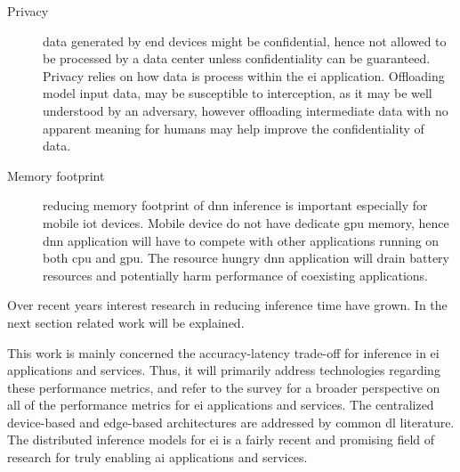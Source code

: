 \begin{description}
	\item[Privacy] data generated by end devices might be confidential, hence not allowed to be processed by a data center unless confidentiality can be guaranteed. Privacy relies on how data is process within the \gls{ei} application. Offloading model input data, may be susceptible to interception, as it may be well understood by an adversary, however offloading intermediate data with no apparent meaning for humans may help improve the confidentiality of data.    
	
	\item[Memory footprint] reducing memory footprint of \gls{dnn} inference is important especially for mobile \gls{iot} devices. Mobile device do not have dedicate \gls{gpu} memory, hence \gls{dnn} application will have to compete with other applications running on both \gls{cpu} and \gls{gpu}. The resource hungry \gls{dnn} application will drain battery resources and potentially harm performance of coexisting applications. 
\end{description}


Over recent years interest research in reducing inference time have grown. In the next section related work will be explained.  


  


This work is mainly concerned the accuracy-latency trade-off for inference in \gls{ei} applications and services. Thus, it will primarily address technologies regarding these performance metrics, and refer to the survey for a broader perspective on all of the performance metrics for \gls{ei} applications and services. The centralized device-based and edge-based architectures are addressed by common \gls{dl} literature. The distributed inference models for \gls{ei} is a fairly recent and promising field of research for truly enabling \gls{ai} applications and services.

